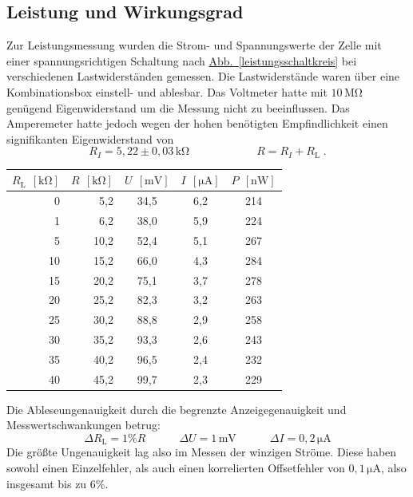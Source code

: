\documentclass[11pt]{scrartcl}
\newcommand{\unit}[1]{\ensuremath{\,\mathrm{#1}}} %
\begin{document}
\subsection{Leistung und Wirkungsgrad}
Zur Leistungsmessung wurden die Strom- und Spannungswerte der Zelle mit einer spannungsrichtigen Schaltung nach \hyperref[leistungsschaltkreis]{Abb.~\ref{leistungsschaltkreis}} bei verschiedenen Lastwiderständen gemessen. Die Lastwiderstände waren über eine Kombinationsbox einstell- und ablesbar. Das Voltmeter hatte mit $10\unit{M\Omega}$ genügend Eigenwiderstand um die Messung nicht zu beeinflussen. Das Amperemeter hatte jedoch wegen der hohen benötigten Empfindlichkeit einen signifikanten Eigenwiderstand von
\[
R_I = 5,22\pm 0,03 \unit{k\Omega}
\qquad\qquad\qquad
R = R_I+R_{\text{L}}\;.
\]
\begin{table}[ht]
\label{leistungsmesstabelle}
\begin{center}\vspace{-\baselineskip}
\begin{tabular}{rr|ccc}
$R_{\text{L}}\; \unit{[k\Omega]}$ &
$R\; \unit{[k\Omega]}$ &
$U\; \unit{[mV]}$ &
$I\; \unit{[\mu A]}$ &
$P\; \unit{[nW]}$ \\
\hline
0	& 5,2	& 34,5	& 6,2	& 214 \\
1	& 6,2	& 38,0	& 5,9	& 224 \\
5	& 10,2	& 52,4	& 5,1	& 267 \\
10	& 15,2	& 66,0	& 4,3	& 284 \\
15	& 20,2	& 75,1	& 3,7	& 278 \\
20	& 25,2	& 82,3	& 3,2	& 263 \\
25	& 30,2	& 88,8	& 2,9	& 258 \\
30	& 35,2	& 93,3	& 2,6	& 243 \\
35	& 40,2	& 96,5	& 2,4	& 232 \\
40	& 45,2	& 99,7	& 2,3	& 229
\end{tabular}
\vspace{-\baselineskip}\end{center}
\end{table}
Die Ableseungenauigkeit durch die begrenzte Anzeigegenauigkeit und Messwertschwankungen betrug:
\[
\Delta R_{\text{L}} = 1\% R
\qquad\quad
\Delta U = 1\unit{mV}
\qquad\quad
\Delta I = 0,2\unit{\mu A}
\]
Die größte Ungenauigkeit lag also im Messen der winzigen Ströme. Diese haben sowohl einen Einzelfehler, als auch einen korrelierten Offsetfehler von $0,1\unit{\mu A}$, also insgesamt bis zu 6\%.
\end{document}
